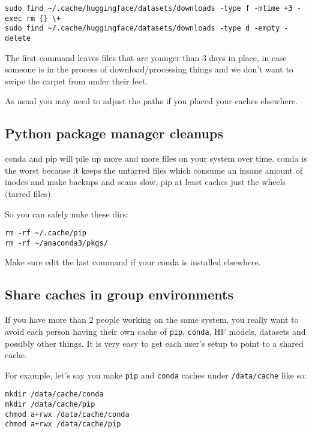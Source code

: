 \documentclass[
]{report}
\begin{document}
\begin{verbatim}
sudo find ~/.cache/huggingface/datasets/downloads -type f -mtime +3 -exec rm {} \+
sudo find ~/.cache/huggingface/datasets/downloads -type d -empty -delete
\end{verbatim}

The first command leaves files that are younger than 3 days in place, in
case someone is in the process of download/processing things and we
don't want to swipe the carpet from under their feet.

As usual you may need to adjust the paths if you placed your caches
elsewhere.

\subsection{Python package manager
cleanups}\label{python-package-manager-cleanups}

conda and pip will pile up more and more files on your system over time.
conda is the worst because it keeps the untarred files which consume an
insane amount of inodes and make backups and scans slow. pip at least
caches just the wheels (tarred files).

So you can safely nuke these dirs:

\begin{verbatim}
rm -rf ~/.cache/pip
rm -rf ~/anaconda3/pkgs/
\end{verbatim}

Make sure edit the last command if your conda is installed elsewhere.

\subsection{Share caches in group
environments}\label{share-caches-in-group-environments}

If you have more than 2 people working on the same system, you really
want to avoid each person having their own cache of \texttt{pip},
\texttt{conda}, HF models, datasets and possibly other things. It is
very easy to get each user's setup to point to a shared cache.

For example, let's say you make \texttt{pip} and \texttt{conda} caches
under \texttt{/data/cache} like so:

\begin{verbatim}
mkdir /data/cache/conda
mkdir /data/cache/pip
chmod a+rwx /data/cache/conda
chmod a+rwx /data/cache/pip
\end{verbatim}
\end{document}
